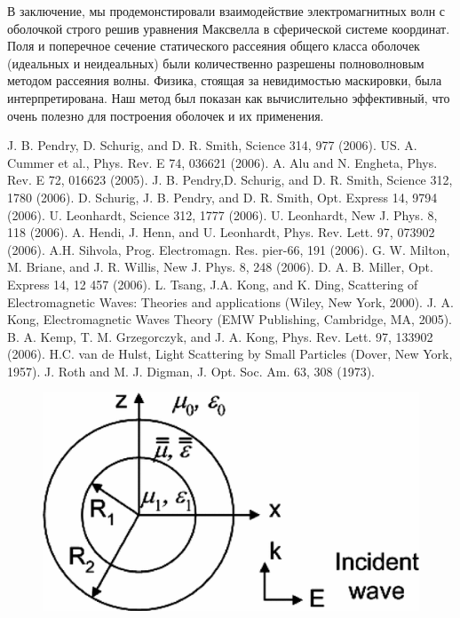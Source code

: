 \documentclass[a4paper, 12pt]{article}
\begin{document}
В заключение, мы продемонстировали взаимодействие электромагнитных волн с 
оболочкой строго решив уравнения Максвелла в сферической системе координат.
Поля и поперечное сечение статического рассеяния общего класса оболочек
(идеальных и неидеальных) были количественно разрешены полноволновым методом 
рассеяния волны. Физика, стоящая за невидимостью маскировки, была интерпретирована.
Наш метод был показан как вычислительно эффективный, что очень полезно для
построения оболочек и их применения.


\begin{thebibliography}{99}
J. B. Pendry, D. Schurig, and D. R. Smith, Science 314, 977 (2006).
US. A. Cummer et al., Phys. Rev. E 74, 036621 (2006).
A. Alu and N. Engheta, Phys. Rev. E 72, 016623 (2005).
J. B. Pendry,D. Schurig, and D. R. Smith, Science 312, 1780 (2006).
D. Schurig, J. B. Pendry, and D. R. Smith, Opt. Express 14,
9794 (2006).
U. Leonhardt, Science 312, 1777 (2006).
U. Leonhardt, New J. Phys. 8, 118 (2006).
A. Hendi, J. Henn, and U. Leonhardt, Phys. Rev. Lett. 97,
073902 (2006).
A.H. Sihvola, Prog. Electromagn. Res. pier-66, 191
(2006).
G. W. Milton, M. Briane, and J. R. Willis, New J. Phys. 8,
248 (2006).
D. A. B. Miller, Opt. Express 14, 12 457 (2006).
L. Tsang, J.A. Kong, and K. Ding, Scattering of
Electromagnetic Waves: Theories and applications
(Wiley, New York, 2000).
J. A. Kong, Electromagnetic Waves Theory (EMW Publishing, Cambridge, 
MA, 2005).
B. A. Kemp, T. M. Grzegorczyk, and J. A.
Kong, Phys. Rev. Lett. 97, 133902 (2006).
H.C. van de Hulst, Light Scattering by Small Particles (Dover, New 
York, 1957).
J. Roth and M. J. Digman, J. Opt. Soc. Am. 63, 308 (1973).

\end{thebibliography}

\begin{figure}[h]
  \centering
  \includegraphics[height=0.25\paperheight]{fig1.png}
  \caption{}
  \label{fig:1}
\end{figure}
\end{document}
